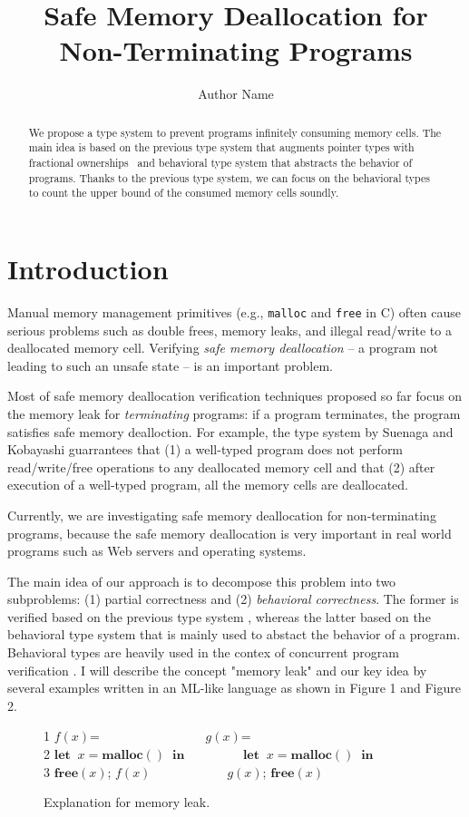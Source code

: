 \documentclass[english]{jssst_ppl} %
\title{Safe Memory Deallocation for Non-Terminating Programs}
\author{Author Name}
\newcommand\LET{\mathbf{let}\;}
\newcommand\IN{\mathbf{in}\;}
\newcommand\MALLOC{\mathbf{malloc()}\;}
\newcommand\Free{\mathbf{free}}
\newcommand\Cirx{(x)}
\newcommand\dtb{\;\;\ \;\;\ \;\;\ \;\;\  }
\begin{document}
\maketitle
\begin{abstract}
We propose a type system to prevent programs infinitely consuming memory cells. The main idea is based on the previous type system that augments pointer types with fractional ownerships~\cite{DBLP:conf/aplas/SuenagaK09} and behavioral type system that abstracts the behavior of programs. Thanks to the previous type system, we can focus on the behavioral types to count the upper bound of the consumed memory cells soundly.
\end{abstract}

\section{Introduction}
Manual memory management primitives (e.g., {\tt malloc} and {\tt free} in C) often cause serious problems such as double frees, memory leaks, and illegal read/write to a deallocated memory cell. Verifying \emph{safe memory deallocation} -- a program not leading to such an unsafe state -- is an important problem.

Most of safe memory deallocation verification techniques proposed so far \cite{DBLP:conf/aplas/SuenagaK09,DBLP:conf/pldi/HeineL03,DBLP:conf/sigsoft/XieA05,DBLP:journals/scp/SwamyHMGJ06} focus on the memory leak for \emph{terminating} programs: if a program terminates, the program satisfies safe memory dealloction. For example, the type system by Suenaga and Kobayashi \cite{DBLP:conf/aplas/SuenagaK09} guarrantees that (1) a well-typed program does not perform read/write/free operations to any deallocated memory cell and that (2) after execution of a well-typed program, all the memory cells are deallocated.

Currently, we are investigating safe memory deallocation for non-terminating programs, because the safe memory deallocation is very important in real world programs such as Web servers and operating systems.

The main idea of our approach is to decompose this problem into two subproblems: (1) partial correctness and (2) \emph{behavioral correctness}. The former is verified based on the previous type system \cite{DBLP:conf/aplas/SuenagaK09}, whereas the latter based on the behavioral type system that is mainly used to abstact the behavior of a program. Behavioral types are heavily used in the contex of concurrent program verification \cite{DBLP:journals/lmcs/KobayashiSW06,DBLP:journals/tcs/IgarashiK04,DBLP:conf/esop/HondaVK98}. I will describe the concept "memory leak" and our key idea by several examples written in an ML-like language as shown in Figure 1 and Figure 2.
\begin{figure}[h]
1 \;\; $f(x)$= \dtb\dtb \dtb \dtb$g(x)$= \\
2 \;\; $\LET \; x = \MALLOC  \; \IN$ \dtb \dtb\;$\LET \; x = \MALLOC  \; \IN$\\
3 \;\; $\Free\Cirx$; \; $f(x)$\dtb\dtb\dtb\;$g(x)$; \; $\Free\Cirx$
\caption{Explanation for memory leak.}
\label{example:memoryLeak}
\end{figure}
\end{document}
